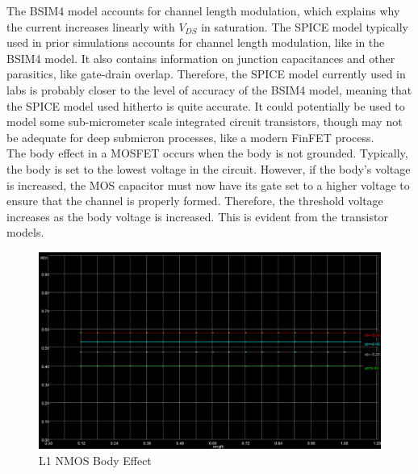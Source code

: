 \FloatBarrier

The BSIM4 model accounts for channel length modulation, which explains why the current increases linearly with $V_{DS}$ in saturation.
The SPICE model typically used in prior simulations accounts for channel length modulation, like in the BSIM4 model.
It also contains information on junction capacitances and other parasitics, like gate-drain overlap.
Therefore, the SPICE model currently used in labs is probably closer to the level of accuracy of the BSIM4 model, meaning that the SPICE model used hitherto is quite accurate.
It could potentially be used to model some sub-micrometer scale integrated circuit transistors, though may not be adequate for deep submicron processes, like a modern FinFET process. \\

The body effect in a MOSFET occurs when the body is not grounded.
Typically, the body is set to the lowest voltage in the circuit.
However, if the body's voltage is increased, the MOS capacitor must now have its gate set to a higher voltage to ensure that the channel is properly formed.
Therefore, the threshold voltage increases as the body voltage is increased.
This is evident from the transistor models.

\FloatBarrier

\begin{figure}[h!]
	\centering
	\includegraphics[scale=0.75]{../images/l1_bodyeffect.PNG}
	\caption{L1 NMOS Body Effect}
	\label{fig:l1_bodyeffect}
\end{figure}

\FloatBarrier

\FloatBarrier

